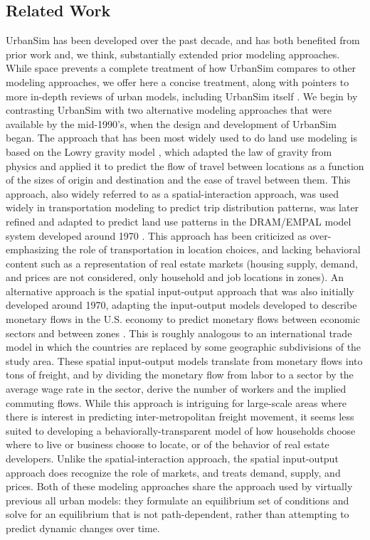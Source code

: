 
\subsection{Related Work}

UrbanSim has been developed over the past decade, and has both benefited
from prior work and, we think, substantially extended prior modeling
approaches.  While space prevents a complete treatment of how UrbanSim
compares to other modeling approaches, we offer here a concise treatment,
along with pointers to more in-depth reviews of urban models, including
UrbanSim itself
\cite{dowling-nchrp-2005,miller-tcrp-1999,southworth-1995,waddell-ulfarsson-2004}.
We begin by
contrasting UrbanSim with two alternative modeling approaches that were
available by the mid-1990's, when the design and development of UrbanSim
began.  The approach that has been most widely used to do land use modeling
is based on the Lowry gravity model \cite{lowry-1964}, which adapted the
law of gravity from physics and applied it to predict the flow of travel
between locations as a function of the sizes of origin and destination and
the ease of travel between them.  This approach, also widely referred to as
a spatial-interaction approach, was used widely in transportation modeling
to predict trip distribution patterns, was later refined and adapted to
predict land use patterns in the DRAM/EMPAL model system developed around
1970 \cite{putman-book-1983}.  This approach has been criticized as
over-emphasizing the role of transportation in location choices, and
lacking behavioral content such as a representation of real estate markets
(housing supply, demand, and prices are not considered, only household and
job locations in zones).  An alternative approach is the spatial
input-output approach that was also initially developed around 1970,
adapting the input-output models developed to describe monetary flows in
the U.S. economy to predict monetary flows between economic sectors and
between zones \cite{delabarra-book-1995,echenique-transport-reviews-1990}.
This is roughly analogous to an international trade model in which the
countries are replaced by some geographic subdivisions of the study area.
These spatial input-output models translate from monetary flows into tons
of freight, and by dividing the monetary flow from labor to a sector by the
average wage rate in the sector, derive the number of workers and the
implied commuting flows.  While this approach is intriguing for large-scale
areas where there is interest in predicting inter-metropolitan freight
movement, it seems less suited to developing a
behaviorally-transparent model of how households choose where to live or
business choose to locate, or of the behavior of real estate developers.
Unlike the spatial-interaction approach, the spatial input-output approach
does recognize the role of markets, and treats demand, supply, and
prices.  Both of these modeling approaches share the approach used by
virtually previous all urban models: they formulate an equilibrium set of
conditions and solve for an equilibrium that is not path-dependent, rather
than attempting to predict dynamic changes over time.

